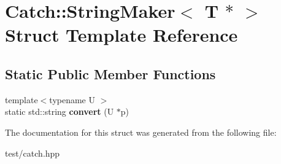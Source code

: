 \hypertarget{structCatch_1_1StringMaker_3_01T_01_5_01_4}{}\section{Catch\+:\+:String\+Maker$<$ T $\ast$ $>$ Struct Template Reference}
\label{structCatch_1_1StringMaker_3_01T_01_5_01_4}
\subsection*{Static Public Member Functions}
\begin{DoxyCompactItemize}
\item 
{\footnotesize template$<$typename U $>$ }\\static std\+::string {\bfseries convert} (U $\ast$p)\hypertarget{structCatch_1_1StringMaker_3_01T_01_5_01_4_a2adbc75c99d71b8323f4052bcb0815c9}{}\label{structCatch_1_1StringMaker_3_01T_01_5_01_4_a2adbc75c99d71b8323f4052bcb0815c9}

\end{DoxyCompactItemize}


The documentation for this struct was generated from the following file\+:\begin{DoxyCompactItemize}
\item 
test/catch.\+hpp\end{DoxyCompactItemize}
